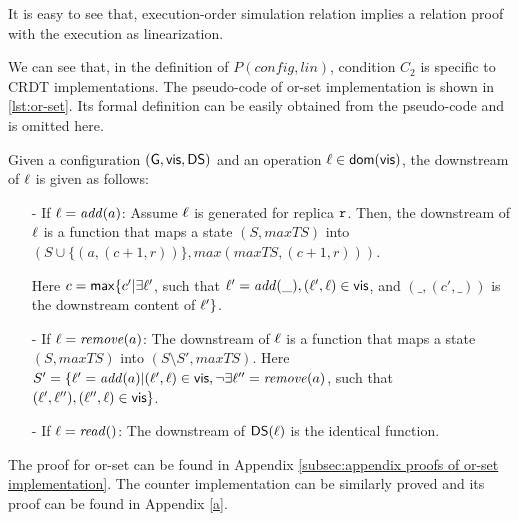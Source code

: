 It is easy to see that, execution-order simulation relation implies a \crdtlinearizable{} relation proof with the execution as linearization.

We can see that, in the definition of $P(\mathit{config},\mathit{lin})$, condition $C_2$ is specific to CRDT implementations. The pseudo-code of or-set implementation is shown in \autoref{lst:or-set}. Its formal definition can be easily obtained from the pseudo-code and is omitted here.

\begin{example}
\label{example:condition c2 for or-set implementation}
Given a configuration $(\gstates, \avisord, \downstreams)$ and an operation $\alabel \in \dom{\avisord}$, the downstream of $\alabel$ is given as follows: 

\begin{itemize}
\setlength{\itemsep}{0.5pt}
\item[-] If $\alabel = \alabellongNoret[\mathit{add}]{\argv}$: Assume $\alabel$ is generated for replica $\arep$. Then, the downstream of $\alabel$ is a function that maps a state $(S,\mathit{maxTS})$ into $(S \cup \{ (a,(c+1,r)) \}, \mathit{max}(\mathit{maxTS},(c+1,r)))$.  
    
    Here $c = \mathsf{max}\{ c' \vert \exists \alabel'$, such that $\alabel' = \alabellongNoret[\mathit{add}]{\_}, (\alabel', \alabel) \in \avisord$, and $(\_,(c',\_))$ is the downstream content of $\alabel' \}$. 

\item[-] If $\alabel = \alabellongNoret[\mathit{remove}]{\argv}$: The downstream of $\alabel$ is a function that maps a state $(S,\mathit{maxTS})$ into $(S \setminus S', \mathit{maxTS})$. 
    Here $S' = \{ \alabel' = \alabellongNoret[\mathit{add}]{\argv} \vert (\alabel',\alabel) \in \avisord, \neg \exists \alabel'' = \alabellongNoret[\mathit{remove}]{\argv}$, such that $(\alabel',\alabel''), (\alabel'',\alabel) \in \avisord \}$. 

\item[-] If $\alabel = \alabellongNoret[\mathit{read}]{}$: The downstream of $\downstreams(\alabel)$ is the identical function. 
\end{itemize}
\end{example}

The proof for or-set can be found in Appendix \ref{subsec:appendix proofs of or-set implementation}. The counter implementation can be similarly proved and its proof can be found in Appendix \ref{a}.

